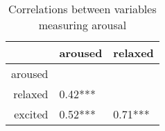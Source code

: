 \begin{table}[ht]
\centering
\begin{tabular}{rll}
  \hline
 & aroused & relaxed \\ 
  \hline
aroused &  &  \\ 
  relaxed &  0.42*** &  \\ 
  excited &  0.52*** &  0.71*** \\ 
   \hline
\end{tabular}
\caption{Correlations between variables measuring arousal} 
\label{tab:arousalCorrTable}
\end{table}
